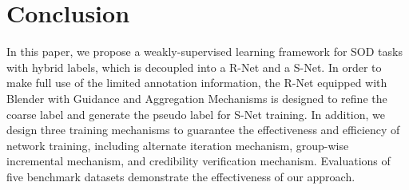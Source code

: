 \documentclass[journal]{IEEEtran}
\begin{document}
\section{Conclusion}
In this paper, we propose a weakly-supervised learning framework for SOD tasks with hybrid labels, which is decoupled into a R-Net and a S-Net. In order to make full use of the limited annotation information, the R-Net equipped with Blender with Guidance and Aggregation Mechanisms is designed to refine the coarse label and generate the pseudo label for S-Net training.
In addition, we design three training mechanisms to guarantee the effectiveness and efficiency of network training, including alternate iteration mechanism, group-wise incremental mechanism, and credibility verification mechanism.
Evaluations of five benchmark datasets demonstrate the effectiveness of our approach.




















\ifCLASSOPTIONcaptionsoff
  \newpage
\fi









\end{document}

